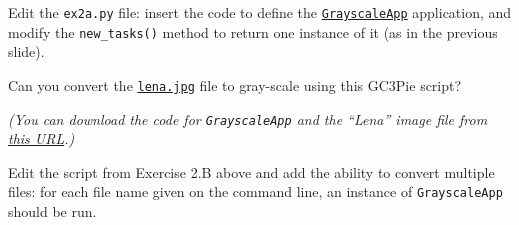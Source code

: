 \documentclass[english,serif,mathserif,xcolor=pdftex,dvipsnames,table]{beamer}
\begin{document}
\begin{frame}[fragile]
  \small

  \begin{exercise*}[2.B]

    \+
    Edit the \texttt{ex2a.py} file: insert the code to define the
    \href{https://raw.githubusercontent.com/uzh/gc3pie/master/docs/programmers/tutorials/workflows/grayscale_app.py}{\texttt{GrayscaleApp}}
    application, and modify the \texttt{new\_tasks()} method to return
    one instance of it (as in the previous slide).

    \+
    Can you convert the \href{https://raw.githubusercontent.com/uzh/gc3pie/master/docs/programmers/tutorials/workflows/lena.jpg}{\texttt{lena.jpg}} file to gray-scale using
    this GC3Pie script?

    \+ \footnotesize
    {\em (You can download the code for \texttt{GrayscaleApp} and the ``Lena'' image file from
    \href{https://raw.githubusercontent.com/uzh/gc3pie/master/docs/programmers/tutorials/workflows/}{this
      URL}.)}
  \end{exercise*}

  \+
  \begin{exercise*}[2.C]

    Edit the script from Exercise 2.B above and add the ability to
    convert multiple files: for each file name given on the command
    line, an instance of \texttt{GrayscaleApp} should be run.
  \end{exercise*}
\end{frame}
\end{document}
